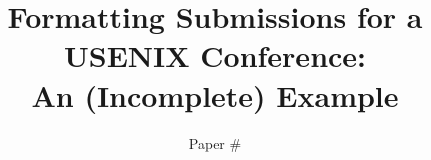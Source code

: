 \documentclass[letterpaper,twocolumn,10pt]{article}
\title{\Large \bf Formatting Submissions for a USENIX Conference:\\
  An (Incomplete) Example}
\author {
Paper \# \todo{XXX}
}
\begin{document}

\date{}

\maketitle










\balance


\end{document}
